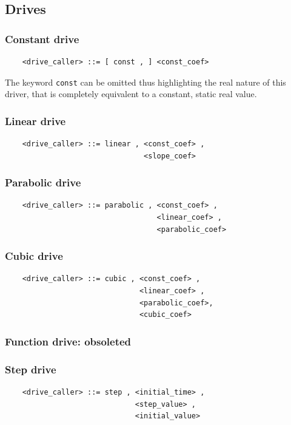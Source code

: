 \documentclass[10pt,dvips]{report}
\begin{document}
\subsection{Drives}

\subsubsection{Constant drive}
\begin{verbatim}
    <drive_caller> ::= [ const , ] <const_coef>                    
\end{verbatim}
The keyword {\tt const} can be omitted thus highlighting the real nature
of this driver, that is completely equivalent to a constant, static real
value.
  
\subsubsection{Linear drive}
\begin{verbatim}
    <drive_caller> ::= linear , <const_coef> , 
                                <slope_coef>
\end{verbatim}

\subsubsection{Parabolic drive}
\begin{verbatim}
    <drive_caller> ::= parabolic , <const_coef> , 
                                   <linear_coef> , 
                                   <parabolic_coef>
\end{verbatim}

\subsubsection{Cubic drive}
\begin{verbatim}
    <drive_caller> ::= cubic , <const_coef> , 
                               <linear_coef> ,
                               <parabolic_coef>, 
                               <cubic_coef>
\end{verbatim}

\subsubsection{Function drive: obsoleted}

\subsubsection{Step drive}
\begin{verbatim}
    <drive_caller> ::= step , <initial_time> , 
                              <step_value> ,
                              <initial_value>
\end{verbatim}    
\end{document}
